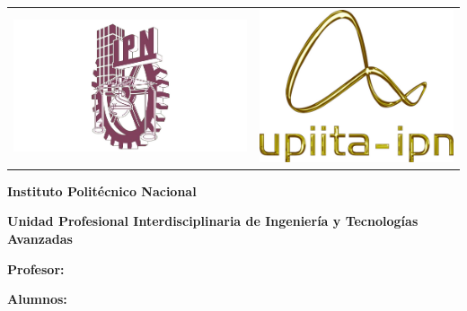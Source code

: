 \begin{titlepage}
    \noindent
    \begin{tabular}{@{} p{} p{} @{}}
        \includegraphics[width=0.8\linewidth]{./img/logo-ipn.png} &
        \hfill \includegraphics[width=0.6\linewidth]{./img/logo-upiita.png} \\
    \end{tabular}


    \centering
    \vspace*{1cm}
    {\huge \textbf{Instituto Politécnico Nacional} \par}
    {\LARGE \textbf{Unidad Profesional Interdisciplinaria de Ingeniería y Tecnologías Avanzadas} \par}
    \vspace{1.5cm}
    {\LARGE \textbf{\materia} \par} %
    \vspace{1cm}
    {\Huge \titulo \par}            %
    \vspace{2cm}
    {\large \textbf{Profesor:} \profesor \par} %
    {\large \textbf{Alumnos:} \alumno \par}     %
    {\large \alumnodos}
    \vfill
    {\large \textbf{\grupo} \par}       %
    
    {\large \fecha \par}            %
\end{titlepage}